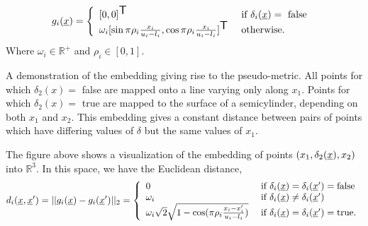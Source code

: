 \documentclass[landscape,a0b,final,a4resizeable]{include/a0poster}
\newcommand{\vect}[1]{\underline{\smash{#1}}}
\renewcommand{\v}[1]{\vect{#1}}
\newcommand{\reals}{\mathds{R}}
\newcommand{\br}{}%
\newcommand\transpose{{\textrm{\tiny{\sf{T}}}}}
\newcommand{\embeddingletter}{g}
\begin{document}
\begin{poster}
\begin{multicols}{3}
\begin{equation*}
\embeddingletter_i\br(\v{x}) = \left\{\begin{array}{ll}
[0,0]^\transpose & \textrm{ if } \delta_i(\v{x}) = \textrm{ false }\\
\omega_i [\sin{\pi\rho_i\frac{x_i}{u_i-l_i}}, \cos{\pi\rho_i\frac{x_i}{u_i-l_i}}]^\transpose & \textrm{ otherwise.}\end{array}\right.
\end{equation*}
Where $\omega_i \in \mathbb{R}^+$ and $\rho_i \in [0,1]$.\hfill{}
\linebreak
%


\begin{center}
\label{fig:cylinder}
\end{center}

A demonstration of the embedding giving rise to the pseudo-metric.  All points for which $\delta_2(x) =$ false are mapped onto a line varying only along $x_1$.  Points for which $\delta_2(x) =$ true are mapped to the surface of a semicylinder, depending on both $x_1$ and $x_2$.  This embedding gives a constant distance between pairs of points which have differing values of $\delta$ but the same values of $x_1$.\hfill{}
\linebreak

The figure above
shows a visualization of the embedding of points $(x_1, \delta_2(\v{x}), x_2)$ into $\reals^3$. 
%
In this space, we have the Euclidean distance,
%
\begin{equation*}
d\br_i(\v{x}, \v{x}') = ||\embeddingletter_i\br(\v{x})-\embeddingletter_i\br(\v{x}')||_2 =\left\{\begin{array}{ll}
0 & \textrm{ if } \delta_i(\v{x}) = \delta_i(\v{x}') = \textrm{false}\\
\omega_i & \textrm{ if } \delta_i(\v{x}) \neq \delta_i(\v{x}')\\
\omega_i \sqrt{2} \sqrt{1 - \cos(\pi\rho_i \frac{x_i-x_i'}{u_i-l_i})} & \textrm{ if } \delta_i(\v{x}) = \delta_i(\v{x}') = \textrm{true}. \end{array}\right.
\end{equation*}


\end{multicols}
\end{poster}
\end{document}
